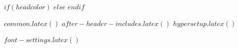 $if(headcolor)$
$else$
$endif$

%
$common.latex()$
$after-header-includes.latex()$
$hypersetup.latex()$

$font-settings.latex()$
